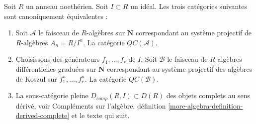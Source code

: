 \begin{proposition}
\label{proposition-derived-complete} Soit
$R$ un anneau noethérien. Soit $I \subset R$ un idéal. Les trois
catégories suivantes sont canoniquement équivalentes :
\begin{enumerate}
\item Soit $\mathcal{A}$ le faisceau de $R$-algèbres sur $\mathbf{N}$ correspondant
au système projectif de $R$-algèbres $A_n = R/I^n$. La catégorie
$\mathit{QC}(\mathcal{A})$.
\item Choisissons des générateurs $f_1, \ldots, f_r$ de $I$. Soit
$\mathcal{B}$ le faisceau de $R$-algèbres différentielles graduées sur
$\mathbf{N}$ correspondant au système projectif des algèbres de
Koszul sur $f_1^n, \ldots, f_r^n$. La catégorie
$\mathit{QC}(\mathcal{B})$.
\item La sous-catégorie pleine $D_{comp}(R, I) \subset D(R)$ des objets
complets au sens dérivé, voir Compléments sur l'algèbre, définition
\ref{more-algebra-definition-derived-complete} et le texte qui suit.
\end{enumerate}
\end{proposition}

